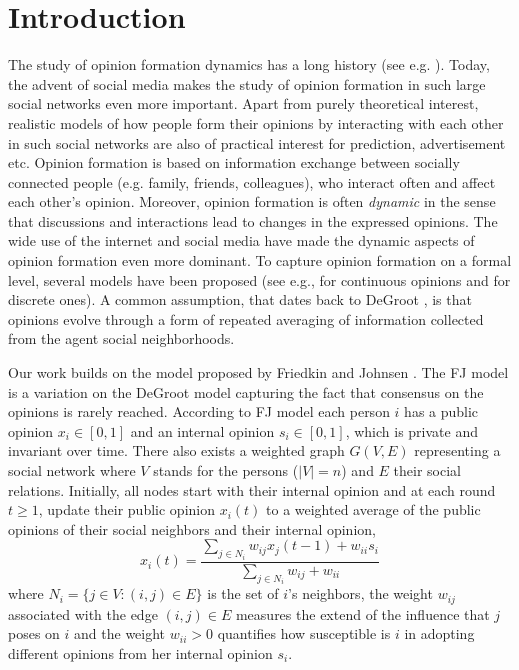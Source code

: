 \section{Introduction}

The study of opinion formation dynamics has a long history (see e.g.
\cite{Jackson}).  Today, the advent of social media makes the study of opinion
formation in such large social networks even more important.  Apart from purely
theoretical interest, realistic models of how people form their opinions by
interacting with each other in such social networks are also of practical
interest for prediction, advertisement etc.  Opinion formation is based on
information exchange between socially connected people (e.g. family, friends,
colleagues), who interact often and affect each other's opinion.  Moreover,
opinion formation is often \emph{dynamic} in the sense that discussions and
interactions lead to changes in the expressed opinions. The wide use of the
internet and social media have made the dynamic aspects of opinion formation
even more dominant.  To capture opinion formation on a formal level, several
models have been proposed (see e.g., \cite{DeGroot,FJ90,HK,BKO11} for
continuous opinions and \cite{FGV12,YOASS13,BFM16} for discrete ones).  A
common assumption, that dates back to DeGroot \cite{DeGroot}, is that opinions
evolve through a form of repeated averaging of information collected from the
agent social neighborhoods.

Our work builds on the model proposed by Friedkin and Johnsen \cite{FJ90}. 
The FJ model is a variation on the DeGroot model capturing the
fact that consensus on the opinions is rarely reached.
According to FJ model each person $i$ has a public opinion $x_i \in [0,1]$
and an internal opinion $s_i\in [0,1]$, which is private and invariant
over time. There also exists a weighted graph $G(V,E)$ representing a social
network where $V$ stands for the persons ($|V|=n$) and $E$ their social
relations. Initially, all nodes start with their internal opinion and
at each round $t\geq1$, update their public opinion $x_i(t)$ to a weighted
average of the public opinions of their social neighbors and their internal opinion,
%
\begin{equation}\label{eq:FJ_model}
  x_i(t)= \frac{\sum_{j\in N_i}w_{ij}x_j(t-1) + w_{ii}s_i}{\sum_{j\in
      N_i}w_{ij}+w_{ii}}
\end{equation}
%
where $N_i =\{j \in V:(i,j) \in E\}$ is the set of $i$'s neighbors,
the weight $w_{ij}$ associated with the edge $(i,j) \in E$ measures the extend
of the influence that $j$ poses on $i$ and the weight $w_{ii}>0$ quantifies how susceptible
is $i$ in adopting different opinions from her internal opinion $s_i$.

